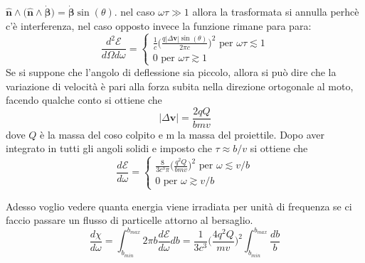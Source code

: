 \documentclass[11pt,a4paper]{report}
\newcommand{\vettore}[1]{\mathbf{#1}}
\newcommand{\pvet}[2]{#1\wedge #2}
\begin{document}
		$\pvet{\hat{\vettore n}}{\big(\pvet{\hat{\vettore n}}{\dot{\vettore \beta}}\big)}=\dot{\vettore \beta}\sin(\theta)$.\newline
		nel caso $\omega\tau\gg1$ allora la trasformata si annulla perhcè c'è interferenza, nel caso opposto invece la funzione rimane para para: 
		\begin{equation}
			\frac{d^2\mathcal{E}}{d\Omega d\omega}=
			\begin{cases}
				\frac1c \Big(\frac{q|\Delta \vettore v|\sin(\theta)}{2\pi c}\Big)^2\textrm{ per } \omega\tau\lesssim 1 \\
				0 \textrm{ per }\omega\tau\gtrsim 1
			\end{cases}
		\end{equation}
		Se si suppone che l'angolo di deflessione sia piccolo, allora si può dire che la variazione di velocità è pari alla forza subita nella direzione ortogonale al moto, facendo qualche conto si ottiene che 
		\[
			|\Delta \vettore v|=\frac{2qQ}{bmv}
		\]
		dove $Q$ è la massa del coso colpito e m la massa del proiettile. Dopo aver integrato in tutti gli angoli solidi e imposto che $\tau\approx b/v$ si ottiene che 
		\begin{equation}
			\frac{d\mathcal{E}}{d\omega}=
			\begin{cases}
				\frac8{3c^3\pi }\Big(\frac{q^2Q}{bmv}\Big)^2\textrm{ per } \omega\lesssim v/b \\
				0 \textrm{ per }\omega\gtrsim v/b
			\end{cases}
		\end{equation}

		Adesso voglio vedere quanta energia viene irradiata per unità di frequenza se ci faccio passare un flusso di particelle attorno al bersaglio.\newline
		\begin{equation}
			\frac{d\chi}{d\omega}=\int_{b_{min}}^{b_{max}}2\pi b  \frac{d\mathcal{E}}{d\omega}db=\frac1{3c^3 }\Big(\frac{4q^2Q}{mv}\Big)^2\int_{b_{min}}^{b_{max}} \frac{db}b
		\end{equation}
\end{document}
